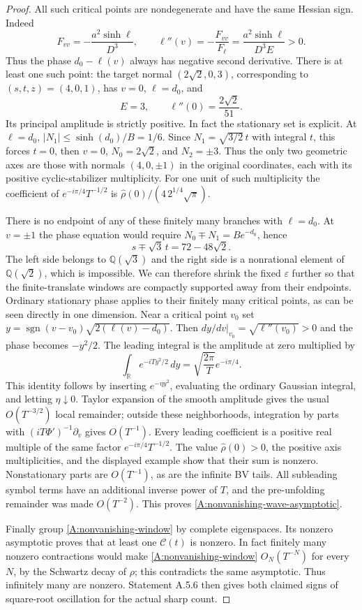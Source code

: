 \begin{proof}
All such critical points are nondegenerate and have the same
Hessian sign. Indeed
\[
 F_{vv}=-\frac{a^2\sinh\ell}{D^3},\qquad
 \ell''(v)=-\frac{F_{vv}}{F_\ell}
     =\frac{a^2\sinh\ell}{D^3E}>0.
\]
Thus the phase $d_0-\ell(v)$ always has negative second derivative.
There is at least one such point: the target normal
$(2\sqrt2,0,3)$, corresponding to $(s,t,z)=(4,0,1)$,
has $v=0$, $\ell=d_0$, and
\[
 E=3,\qquad \ell''(0)=\frac{2\sqrt2}{51}.
\]
Its principal amplitude is strictly positive.
In fact the stationary set is explicit. At $\ell=d_0$,
$|N_1|\leq\sinh(d_0)/B=1/6$.
Since $N_1=\sqrt{3/2}\,t$ with integral $t$, this forces $t=0$,
then $v=0$, $N_0=2\sqrt2$, and $N_2=\pm3$.
Thus the only two geometric axes are those with normals
$(4,0,\pm1)$ in the original coordinates, each with its positive
cyclic-stabilizer multiplicity.
For one unit of such multiplicity the coefficient of
$e^{-i\pi/4}T^{-1/2}$ is
$\widehat\rho(0)/(4\,2^{1/4}\sqrt\pi)$.

There is no endpoint of any of these finitely many branches
with $\ell=d_0$.
At $v=\pm1$ the phase equation would require
$N_0\mp N_1=B e^{-d_0}$, hence
\[
 s\mp\sqrt3\,t=72-48\sqrt2.
\]
The left side belongs to $\mathbb Q(\sqrt3)$ and the right side
is a nonrational element of $\mathbb Q(\sqrt2)$, which is impossible.
We can therefore shrink the fixed $\varepsilon$ further so that
the finite-translate windows are compactly supported away from
their endpoints.
Ordinary stationary phase applies to their finitely many critical
points, as can be seen directly in one dimension.
Near a critical point $v_0$ set
$y=\operatorname{sgn}(v-v_0)\sqrt{2(\ell(v)-d_0)}$.
Then $dy/dv|_{v_0}=\sqrt{\ell''(v_0)}>0$ and the phase becomes
$-y^2/2$.
The leading integral is the amplitude at zero multiplied by
\[
 \int_{\mathbb R}e^{-iTy^2/2}\,dy
       =\sqrt{\frac{2\pi}{T}}e^{-i\pi/4}.
\]
This identity follows by inserting $e^{-\eta y^2}$, evaluating
the ordinary Gaussian integral, and letting $\eta\downarrow0$.
Taylor expansion of the smooth amplitude gives the usual
$O(T^{-3/2})$ local remainder; outside these neighborhoods,
integration by parts with $(iT\Phi')^{-1}\partial_v$ gives
$O(T^{-1})$.
Every leading coefficient is a positive real multiple
of the same factor $e^{-i\pi/4}T^{-1/2}$.
The value $\widehat\rho(0)>0$, the positive axis multiplicities,
and the displayed example show that their sum is nonzero.
Nonstationary parts are $O(T^{-1})$, as are the infinite BV tails.
All subleading symbol terms have an additional inverse power of
$T$, and the pre-unfolding remainder was made $O(T^{-2})$.
This proves \eqref{A:nonvanishing-wave-asymptotic}.

Finally group \eqref{A:nonvanishing-window} by complete eigenspaces.
Its nonzero asymptotic proves that at least one $\mathcal C(t)$
is nonzero. In fact finitely many nonzero contractions would make
\eqref{A:nonvanishing-window} $O_N(T^{-N})$ for every $N$, by
the Schwartz decay of $\rho$; this contradicts the same asymptotic.
Thus infinitely many are nonzero.
Statement A.5.6 then gives both claimed signs of
square-root oscillation for the actual sharp count.
\end{proof}
